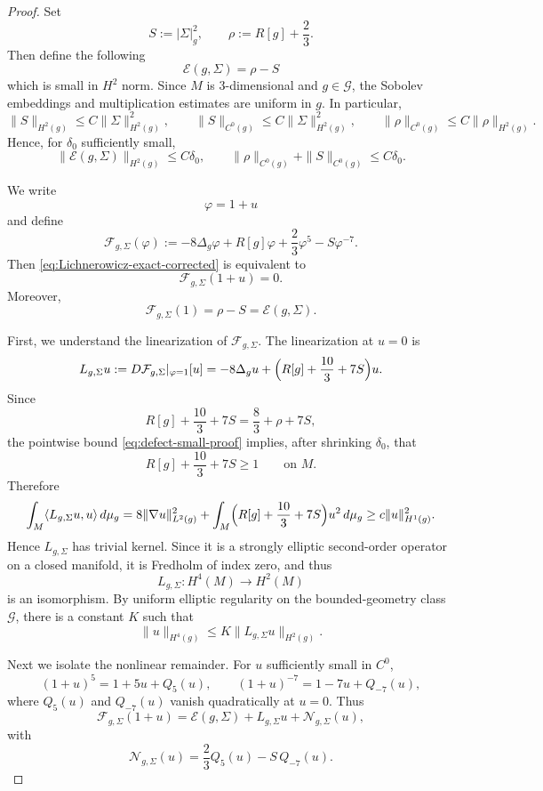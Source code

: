 \documentclass{amsart}
\begin{document}
\begin{proof}
Set
\[
S:=|\Sigma|_{g}^{2},
\qquad
\rho:=R[g]+\frac23.
\]
Then define the following
\[
\mathcal E(g,\Sigma)=\rho-S
\]
which is small in $H^{2}$ norm. 
Since \(M\) is \(3\)-dimensional and \(g\in\mathcal G\), the Sobolev embeddings and
multiplication estimates are uniform in \(g\). In particular,
\[
\|S\|_{H^{2}(g)}\le C\|\Sigma\|_{H^{2}(g)}^{2},
\qquad
\|S\|_{C^{0}(g)}\le C\|\Sigma\|_{H^{2}(g)}^{2},
\qquad
\|\rho\|_{C^{0}(g)}\le C\|\rho\|_{H^{2}(g)}.
\]
Hence, for \(\delta_{0}\) sufficiently small,
\begin{equation}
\label{eq:defect-small-proof}
\|\mathcal E(g,\Sigma)\|_{H^{2}(g)}
\le C\delta_{0},
\qquad
\|\rho\|_{C^{0}(g)}+\|S\|_{C^{0}(g)}\le C\delta_{0}.
\end{equation}

\noindent We write
\[
\varphi=1+u
\]
and define
\[
\mathcal F_{g,\Sigma}(\varphi)
:=
-8\Delta_{g}\varphi + R[g]\varphi + \frac23\varphi^{5}-S\varphi^{-7}.
\]
Then \eqref{eq:Lichnerowicz-exact-corrected} is equivalent to
\[
\mathcal F_{g,\Sigma}(1+u)=0.
\]
Moreover,
\[
\mathcal F_{g,\Sigma}(1)=\rho-S=\mathcal E(g,\Sigma).
\]

\noindent First, we understand the linearization of $\mathcal F_{g,\Sigma}$. The linearization at \(u=0\) is
\[
L_{g,\Sigma}u
:=
D\mathcal F_{g,\Sigma}|_{\varphi=1}[u]
=
-8\Delta_{g}u+\Bigl(R[g]+\frac{10}{3}+7S\Bigr)u.
\]
Since
\[
R[g]+\frac{10}{3}+7S
=
\frac83+\rho+7S,
\]
the pointwise bound \eqref{eq:defect-small-proof} implies, after shrinking \(\delta_{0}\),
that
\[
R[g]+\frac{10}{3}+7S\ge 1
\qquad\text{on }M.
\]
Therefore
\[
\int_{M} \langle L_{g,\Sigma}u,u\rangle\,d\mu_{g}
=
8\|\nabla u\|_{L^{2}(g)}^{2}
+
\int_{M}\Bigl(R[g]+\frac{10}{3}+7S\Bigr)u^{2}\,d\mu_{g}
\ge c\|u\|_{H^{1}(g)}^{2}.
\]
Hence \(L_{g,\Sigma}\) has trivial kernel. Since it is a strongly elliptic second-order
operator on a closed manifold, it is Fredholm of index zero, and thus
\[
L_{g,\Sigma}\colon H^{4}(M)\to H^{2}(M)
\]
is an isomorphism. By uniform elliptic regularity on the bounded-geometry class
\(\mathcal G\), there is a constant \(K\) such that
\begin{equation}
\label{eq:elliptic-L-corrected}
\|u\|_{H^{4}(g)}
\le
K\|L_{g,\Sigma}u\|_{H^{2}(g)}.
\end{equation}

\noindent Next we isolate the nonlinear remainder. For \(u\) sufficiently small in \(C^{0}\),
\[
(1+u)^{5}=1+5u+Q_{5}(u),
\qquad
(1+u)^{-7}=1-7u+Q_{-7}(u),
\]
where \(Q_{5}(u)\) and \(Q_{-7}(u)\) vanish quadratically at \(u=0\). Thus
\[
\mathcal F_{g,\Sigma}(1+u)
=
\mathcal E(g,\Sigma)+L_{g,\Sigma}u+\mathcal N_{g,\Sigma}(u),
\]
with
\[
\mathcal N_{g,\Sigma}(u)
=
\frac23 Q_{5}(u)-S\,Q_{-7}(u).
\]


\end{proof}
\end{document}
